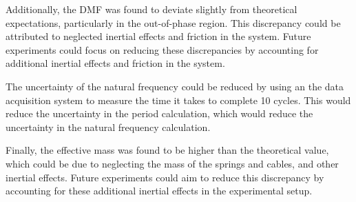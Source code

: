 Additionally, the DMF was found to deviate slightly from theoretical expectations, particularly in the out-of-phase region. This discrepancy could be attributed to neglected inertial effects and friction in the system. Future experiments could focus on reducing these discrepancies by accounting for additional inertial effects and friction in the system. 

The uncertainty of the natural frequency could be reduced by using an the data acquisition system to measure the time it takes to complete 10 cycles. This would reduce the uncertainty in the period calculation, which would reduce the uncertainty in the natural frequency calculation.

Finally, the effective mass was found to be higher than the theoretical value, which could be due to neglecting the mass of the springs and cables, and other inertial effects. Future experiments could aim to reduce this discrepancy by accounting for these additional inertial effects in the experimental setup.